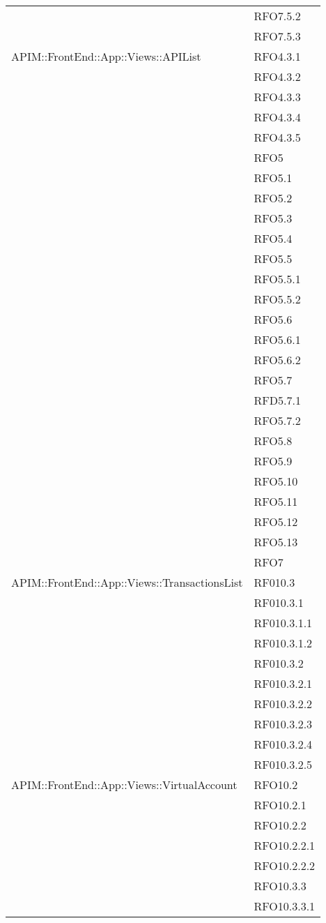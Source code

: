 \begin{longtable}{ p{12cm} | p{4cm} }
	& RFO7.5.2 \\
	& RFO7.5.3 \\
	\hline
	APIM::FrontEnd::App::Views::APIList
	& RFO4.3.1 \\
	& RFO4.3.2 \\
	& RFO4.3.3 \\
	& RFO4.3.4 \\
	& RFO4.3.5 \\
	& RFO5 \\
	& RFO5.1 \\
	& RFO5.2 \\
	& RFO5.3 \\
	& RFO5.4 \\
	& RFO5.5 \\
	& RFO5.5.1 \\
	& RFO5.5.2 \\
	& RFO5.6 \\
	& RFO5.6.1 \\
	& RFO5.6.2 \\
	& RFO5.7 \\
	& RFD5.7.1 \\
	& RFO5.7.2 \\
	& RFO5.8 \\
	& RFO5.9 \\
	& RFO5.10 \\
	& RFO5.11 \\
	& RFO5.12 \\
	& RFO5.13 \\
	& RFO7 \\
	\hline
	APIM::FrontEnd::App::Views::TransactionsList
	& RF010.3 \\
	& RF010.3.1 \\
	& RF010.3.1.1 \\
	& RF010.3.1.2 \\
	& RF010.3.2 \\
	& RF010.3.2.1 \\
	& RF010.3.2.2 \\
	& RF010.3.2.3 \\
	& RF010.3.2.4 \\
	& RF010.3.2.5 \\
	\hline
	APIM::FrontEnd::App::Views::VirtualAccount
	& RFO10.2 \\
	& RFO10.2.1 \\
	& RFO10.2.2 \\
	& RFO10.2.2.1 \\
	& RFO10.2.2.2 \\
	& RFO10.3.3 \\
	& RFO10.3.3.1 \\

\end{longtable}

